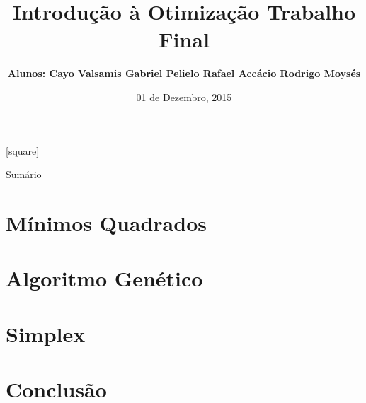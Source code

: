 \documentclass{beamer}
\author{\textbf{Alunos: \newline
		Cayo Valsamis \newline
		Gabriel Pelielo \newline
		Rafael Accácio \newline
		Rodrigo Moysés}}
\title{\textbf{Introdução à Otimização \vspace{0.25cm} \newline 
		       Trabalho Final}}
\institute{Universidade Federal do Rio de Janeiro}
\date{01 de Dezembro, 2015}
\begin{document}
	
	[square]
	
	
	
	\begin{frame}[t,plain]
		\titlepage
	\end{frame}
	
	\begin{frame}{Sumário}
		\tableofcontents
	\end{frame}
	
\section{Mínimos Quadrados}


\section{Algoritmo Genético}


\section{Simplex}


\section{Conclusão}

\end{document}
